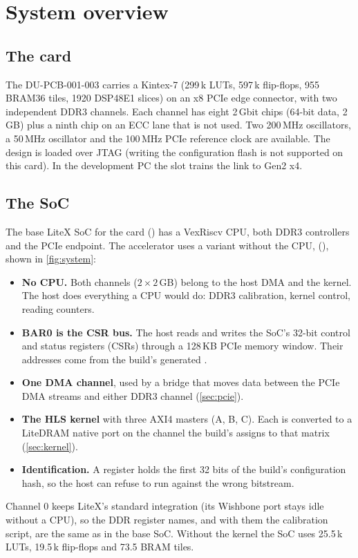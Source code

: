 \section{System overview}
\label{sec:system}

\subsection{The card}
The DU-PCB-001-003 carries a Kintex-7  (299\,k LUTs, 597\,k flip-flops, 955 BRAM36 tiles,
1920 DSP48E1 slices) on an x8 PCIe edge connector, with two independent DDR3 channels. Each channel has eight
2\,Gbit  chips (64-bit data, 2\,GB) plus a ninth chip on an ECC lane that is not used. Two 200\,MHz oscillators,
a 50\,MHz oscillator and the 100\,MHz PCIe reference clock are available. The design is loaded over JTAG
(writing the configuration flash is not supported on this card). In the development PC the slot trains the
link to Gen2 x4.

\subsection{The SoC}
The base LiteX SoC for the card () has a VexRiscv CPU, both DDR3 controllers and the
PCIe endpoint. The accelerator uses a variant without the CPU,  (),
shown in \cref{fig:system}:
\begin{itemize}
  \item \textbf{No CPU.} Both channels (\(2\times2\)\,GB) belong to the host DMA and the kernel. The host does
        everything a CPU would do: DDR3 calibration, kernel control, reading counters.
  \item \textbf{BAR0 is the CSR bus.} The host reads and writes the SoC's 32-bit control and status registers
        (CSRs) through a 128\,KB PCIe memory window. Their addresses come from the build's generated .
  \item \textbf{One DMA channel}, used by a bridge that moves data between the PCIe DMA streams and either DDR3
        channel (\cref{sec:pcie}).
  \item \textbf{The HLS kernel} with three AXI4 masters (A, B, C). Each is converted to a LiteDRAM native port on the
        channel the build's  assigns to that matrix (\cref{sec:kernel}).
  \item \textbf{Identification.} A  register holds the first 32 bits of the build's configuration
        hash, so the host can refuse to run against the wrong bitstream.
\end{itemize}
Channel 0 keeps LiteX's standard  integration (its Wishbone port stays idle without a CPU), so the
DDR register names, and with them the calibration script, are the same as in the base SoC. Without the kernel the
SoC uses 25.5\,k LUTs, 19.5\,k flip-flops and 73.5 BRAM tiles.

